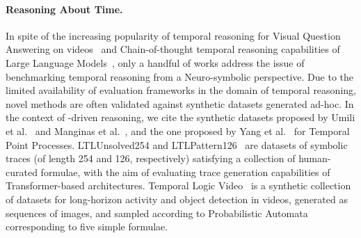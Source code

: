 \paragraph{Reasoning About Time.}
In spite of the increasing popularity of temporal reasoning for Visual Question Answering on videos~\cite{sun2021video} and Chain-of-thought temporal reasoning capabilities of Large Language Models~\cite{xiong2024large,ji2025chain,chu2023timebench}, only a handful of works address the issue of benchmarking temporal reasoning from a Neuro-symbolic perspective.
Due to the limited availability of evaluation frameworks in the domain of temporal reasoning, novel methods are often validated against synthetic datasets generated ad-hoc. In the context of \LTLf-driven reasoning, we cite the synthetic datasets proposed by Umili et al.~\cite{umili2023grounding,umili2024deepdfa} and Manginas et al.~\cite{manginas2024nesya}, and the one proposed by Yang et al.~\cite{yang2024neuro} for Temporal Point Processes.
LTLUnsolved254 and LTLPattern126~\cite{hahn2020teaching} are datasets of symbolic traces (of length 254 and 126, respectively) satisfying a collection of human-curated \LTL formulae, with the aim of evaluating trace generation capabilities of Transformer-based architectures.
Temporal Logic Video~\cite{choi2024towards} is a synthetic collection of datasets for long-horizon activity and object detection in videos, generated as sequences of images, and sampled according to Probabilistic Automata corresponding to five simple \LTL formulae. %
